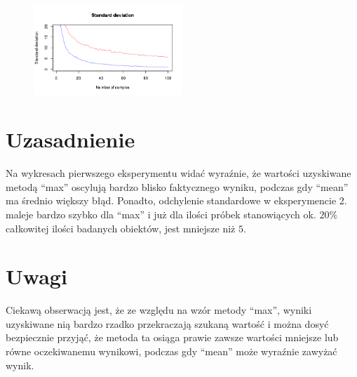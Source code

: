 \documentclass[a4paper,10pt]{article}
\begin{document}
\begin{figure}[h!]
       \centering
       \includegraphics[width=0.5\textwidth]{stddev.png}
\end{figure}

\section{Uzasadnienie}
Na wykresach pierwszego eksperymentu widać wyraźnie, że wartości uzyskiwane metodą ``max'' oscylują bardzo blisko faktycznego wyniku, podczas gdy 
``mean'' ma średnio większy błąd. Ponadto, odchylenie standardowe w eksperymencie 2. maleje bardzo szybko dla ``max'' i już dla ilości próbek
stanowiących ok. $20\%$ całkowitej ilości badanych obiektów, jest mniejsze niż $5$.

\section{Uwagi}
Ciekawą obserwacją jest, że ze względu na wzór metody ``max'', wyniki uzyskiwane nią bardzo rzadko przekraczają szukaną wartość i można dosyć 
bezpiecznie przyjąć, że metoda ta osiąga prawie zawsze wartości mniejsze lub równe oczekiwanemu wynikowi, podczas gdy ``mean'' może wyraźnie
zawyżać wynik.
\end{document}
